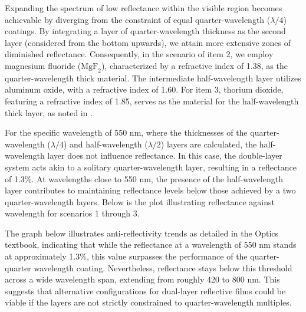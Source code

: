 Expanding the spectrum of low reflectance within the visible region becomes achievable by diverging from the constraint of equal quarter-wavelength ($\lambda/4$) coatings. By integrating a layer of quarter-wavelength thickness as the second layer (considered from the bottom upwards), we attain more extensive zones of diminished reflectance. Consequently, in the scenario of item 2, we employ magnesium fluoride ($\text{MgF}_2$), characterized by a refractive index of 1.38, as the quarter-wavelength thick material. The intermediate half-wavelength layer utilizes aluminum oxide, with a refractive index of 1.60. For item 3, thorium dioxide, featuring a refractive index of 1.85, serves as the material for the half-wavelength thick layer, as noted in \cite{pedrotti_introduction_2007}.

For the specific wavelength of 550 nm, where the thicknesses of the quarter-wavelength ($\lambda/4$) and half-wavelength ($\lambda/2$) layers are calculated, the half-wavelength layer does not influence reflectance. In this case, the double-layer system acts akin to a solitary quarter-wavelength layer, resulting in a reflectance of 1.3\%. At wavelengths close to 550 nm, the presence of the half-wavelength layer contributes to maintaining reflectance levels below those achieved by a two quarter-wavelength layers. Below is the plot illustrating reflectance against wavelength for scenarios 1 through 3.

The graph below illustrates anti-reflectivity trends as detailed in the Optics textbook, indicating that while the reflectance at a wavelength of 550 nm stands at approximately 1.3\%, this value surpasses the performance of the quarter-quarter wavelength coating. Nevertheless, reflectance stays below this threshold across a wide wavelength span, extending from roughly 420 to 800 nm. This suggests that alternative configurations for dual-layer reflective films could be viable if the layers are not strictly constrained to quarter-wavelength multiples.

